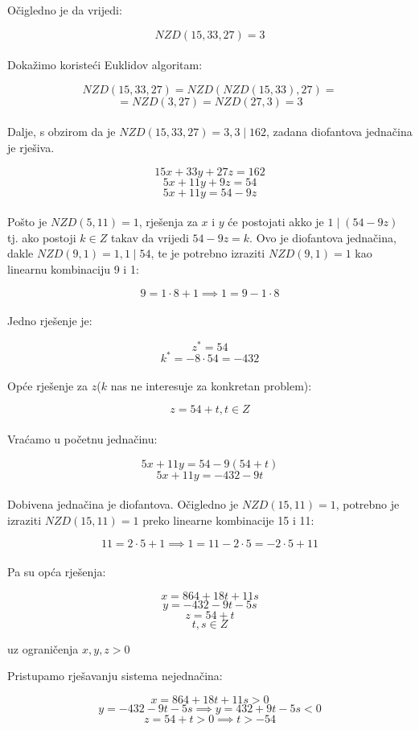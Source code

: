 \documentclass[12pt]{article}
\begin{document}
Očigledno je da vrijedi:

$$NZD(15, 33, 27) = 3$$\\

Dokažimo koristeći Euklidov algoritam:

$$NZD(15, 33, 27) = NZD(NZD(15, 33), 27) =$$ 
$$= NZD(3, 27) = NZD(27, 3) = 3$$\\

Dalje, s obzirom da je $NZD(15, 33, 27) = 3, 3 \mid 162$, zadana diofantova jednačina je rješiva.

$$15x + 33y + 27z = 162$$
$$5x + 11y + 9z = 54$$
$$5x + 11y = 54 - 9z$$\\

Pošto je $NZD(5, 11) = 1$, rješenja za $x$ i $y$ će postojati akko je $1 \mid (54 - 9z)$ tj. ako postoji $k\in Z$ takav da vrijedi $54 - 9z = k$. Ovo je diofantova jednačina, dakle $NZD(9, 1) = 1, 1 \mid 54$, te je potrebno izraziti $NZD(9, 1) = 1$ kao linearnu kombinaciju 9 i 1:

$$9 = 1 \cdot 8 + 1 \implies 1 = 9 - 1 \cdot 8$$\\

Jedno rješenje je:

$$z^{*} = 54$$
$$k^{*} = - 8 \cdot 54 = - 432$$\\

Opće rješenje za $z$($k$ nas ne interesuje za konkretan problem):

$$z = 54 + t, t\in Z$$\\

Vraćamo u početnu jednačinu:

$$5x + 11y = 54 - 9(54 + t)$$
$$5x + 11y = -432 - 9t$$\\

Dobivena jednačina je diofantova. Očigledno je $NZD(15, 11) = 1$, potrebno je izraziti $NZD(15, 11) = 1$ preko linearne kombinacije 15 i 11:

$$11 = 2 \cdot 5 + 1 \implies 1 = 11 - 2 \cdot 5 = - 2 \cdot 5 + 11$$\\

Pa su opća rješenja:

$$x = 864 + 18t + 11s$$
$$y = -432 - 9t - 5s$$
$$z = 54 + t$$
$$t, s\in Z$$
\begin{center}
uz ograničenja $x, y, z > 0$
\end{center}

Pristupamo rješavanju sistema nejednačina:

\[
x = 864 + 18t + 11s > 0 \label{eq:gen1} \tag{1}
\]
\[
y = -432 - 9t - 5s \implies y = 432 + 9t - 5s < 0 \label{eq:gen2} \tag{2}
\]
$$z = 54 + t > 0 \implies t > - 54$$
\end{document}
